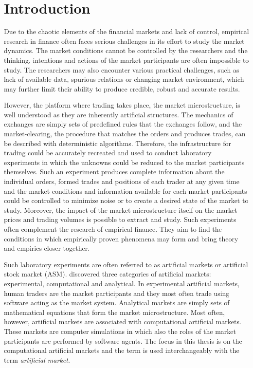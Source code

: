 \section{Introduction}

Due to the chaotic elements of the financial markets and lack of control, 
empirical research in finance often faces serious challenges in its effort to study the 
market dynamics. The market conditions cannot be controlled by the researchers
and the thinking, intentions and actions of the market participants are often impossible to study. 
The researchers may also encounter various practical challenges, such as 
lack of available data, spurious relations or changing market environment, 
which may further limit their ability to produce credible, robust and accurate results. 

However, the platform where trading takes place, the market
microstructure, is well understood as they are inherently artificial structures. 
The mechanics of exchanges are simply sets of predefined rules 
that the exchanges follow, and the market-clearing, the procedure 
that matches the orders and produces trades, can be described with 
deterministic algorithms. Therefore, the infrastructure for trading
could be accurately recreated and used to conduct laboratory 
experiments in which the unknowns could be reduced to the market participants
themselves. Such an experiment produces complete information about
the individual orders, formed trades and positions of each trader at any given time
and the market conditions and information available for each market participants could
be controlled to minimize noise or to create a desired state of the market to
study. Moreover, the impact of the market microstructure itself on the market prices and trading 
volumes is possible to extract and study. Such experiments often complement the research of empirical finance.
They aim to find the conditions in which empirically proven phenomena may form and 
bring theory and empirics closer together. 


Such laboratory experiments are often referred to as artificial markets or artificial
stock market (ASM). \citet{boer05} discovered three categories of artificial markets: 
experimental, computational and analytical. In experimental artificial markets, human traders
are the market participants and they most often trade using software acting as
the market system. Analytical markets are simply sets of mathematical equations that
form the market microstructure. Most often, however, artificial markets are associated with 
computational artificial markets. These markets are computer simulations in which 
also the roles of the market participants are performed by software agents. The focus in this
thesis is on the computational artificial markets and the term is used interchangeably
with the term \textit{artificial market}. 

